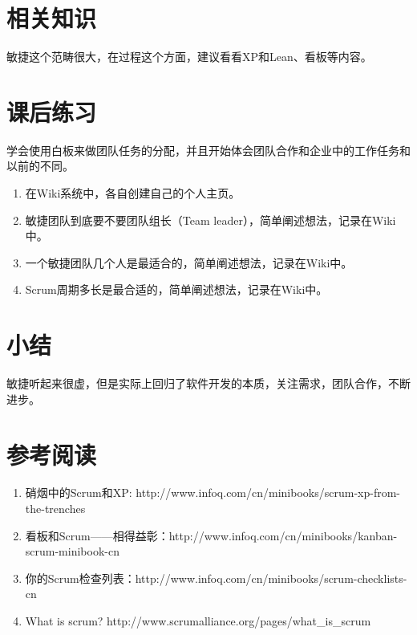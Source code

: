 \section{相关知识}
\label{相关知识}

敏捷这个范畴很大，在过程这个方面，建议看看XP和Lean、看板等内容。

\section{课后练习}
\label{课后练习}

学会使用白板来做团队任务的分配，并且开始体会团队合作和企业中的工作任务和以前的不同。

\begin{enumerate}
\item 在Wiki系统中，各自创建自己的个人主页。

\item 敏捷团队到底要不要团队组长（Team leader），简单阐述想法，记录在Wiki中。

\item 一个敏捷团队几个人是最适合的，简单阐述想法，记录在Wiki中。

\item Scrum周期多长是最合适的，简单阐述想法，记录在Wiki中。

\end{enumerate}

\section{小结}
\label{小结}

敏捷听起来很虚，但是实际上回归了软件开发的本质，关注需求，团队合作，不断进步。

\section{参考阅读}
\label{参考阅读}

\begin{enumerate}
\item 硝烟中的Scrum和XP: http:/\slash www.infoq.com\slash cn\slash minibooks\slash scrum-xp-from-the-trenches

\item 看板和Scrum——相得益彰：http:/\slash www.infoq.com\slash cn\slash minibooks\slash kanban-scrum-minibook-cn

\item 你的Scrum检查列表：http:/\slash www.infoq.com\slash cn\slash minibooks\slash scrum-checklists-cn

\item What is scrum? http:/\slash www.scrumalliance.org\slash pages\slash what\_is\_scrum

\end{enumerate}

